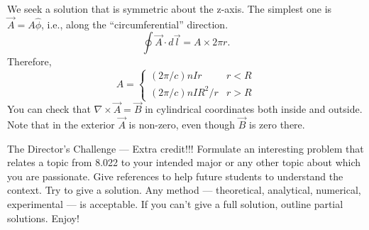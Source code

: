 \documentclass[makesolutionspdf]{esg8022pset}
\begin{document}
\begin{solution}
  We seek a solution that is symmetric about the z-axis.  The simplest one is
  $\vec{A}=A\hat\phi$, i.e., along the ``circumferential'' direction.
  \[ \oint \vec{A}\cdot d\vec{l} = A\times 2\pi r.\]
  Therefore, 
  \begin{equation}
    A = \begin{cases} (2\pi/c)nIr & r<R\\ (2\pi/c)nIR^2/r & r>R \end{cases}
  \end{equation}
  You can check  that $\nabla\times \vec{A}=\vec{B}$ in cylindrical coordinates
  both inside and outside.  Note that in the exterior $\vec{A}$ is non-zero,
  even though $\vec{B}$ is zero there.
\end{solution}





\begin{problem}{The Director's Challenge --- Extra credit!!!}
  Formulate an interesting problem that relates a topic from 8.022 to your
  intended major or any other topic about which you are passionate.  Give references
  to help future students to understand the context.  Try to give a solution.
  Any method --- theoretical, analytical, numerical, experimental --- is acceptable.
  If you can't give a full solution, outline partial solutions. Enjoy!
\end{problem}
\end{document}
